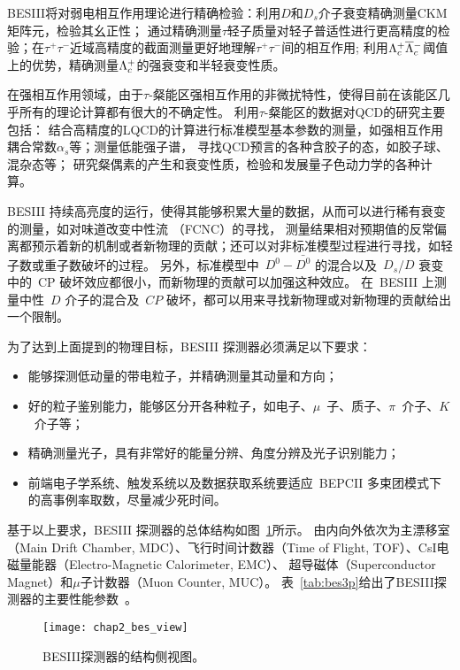 BESIII将对弱电相互作用理论进行精确检验：利用$D$和$D_{s}$介子衰变精确测量CKM矩阵元，检验其幺正性；
通过精确测量$\tau$轻子质量对轻子普适性进行更高精度的检验；在$\tau^+\tau^-$近域高精度的截面测量更好地理解$\tau^+\tau^-$间的相互作用;
利用$\Lambda_{c}^{+}\overline{\Lambda}{}_{c}^{-}$阈值上的优势，精确测量$\Lambda_{c}^{+}$的强衰变和半轻衰变性质。

在强相互作用领域，由于$\tau$-粲能区强相互作用的非微扰特性，使得目前在该能区几乎所有的理论计算都有很大的不确定性。
利用$\tau$-粲能区的数据对QCD的研究主要包括：
结合高精度的LQCD的计算进行标准模型基本参数的测量，如强相互作用耦合常数$\alpha_{s}$等；测量低能强子谱， 寻找QCD预言的各种含胶子的态，如胶子球、混杂态等；
研究粲偶素的产生和衰变性质，检验和发展量子色动力学的各种计算。 

BESIII 持续高亮度的运行，使得其能够积累大量的数据，从而可以进行稀有衰变的测量，如对味道改变中性流 （FCNC）的寻找， 测量结果相对预期值的反常偏离都预示着新的机制或者新物理的贡献；还可以对非标准模型过程进行寻找，如轻子数或重子数破坏的过程。
另外，标准模型中~$D^{0}-\bar{D^{0}}$ 的混合以及~$D_{s}$/$D$ 衰变中的~CP 破坏效应都很小，而新物理的贡献可以加强这种效应。
在~BESIII 上测量中性~$D$ 介子的混合及~$CP$ 破坏，都可以用来寻找新物理或对新物理的贡献给出一个限制。


为了达到上面提到的物理目标，BESIII 探测器必须满足以下要求：
\begin{itemize}
\item 能够探测低动量的带电粒子，并精确测量其动量和方向；
\item 好的粒子鉴别能力，能够区分开各种粒子，如电子、$\mu$~子、质子、$\pi$~介子、$K$~介子等；
\item 精确测量光子，具有非常好的能量分辨、角度分辨及光子识别能力；
\item 前端电子学系统、触发系统以及数据获取系统要适应~BEPCII 多束团模式下的高事例率取数，尽量减少死时间。
\end{itemize}

基于以上要求，BESIII 探测器的总体结构如图~\ref{fig:BESIII}所示。
由内向外依次为主漂移室（Main Drift Chamber, MDC）、飞行时间计数器（Time of Flight, TOF）、CsI电磁量能器（Electro-Magnetic Calorimeter, EMC）、 超导磁体（Superconductor Magnet）和$\mu$子计数器（Muon Counter, MUC）。
表~\ref{tab:bes3p}给出了BESIII探测器的主要性能参数~\cite{BESIII}。

\begin{figure}
 \centering
 \texttt{[image: chap2\_bes\_view]}
 \caption{BESIII探测器的结构侧视图。}
 \label{fig:BESIII}
\end{figure}


